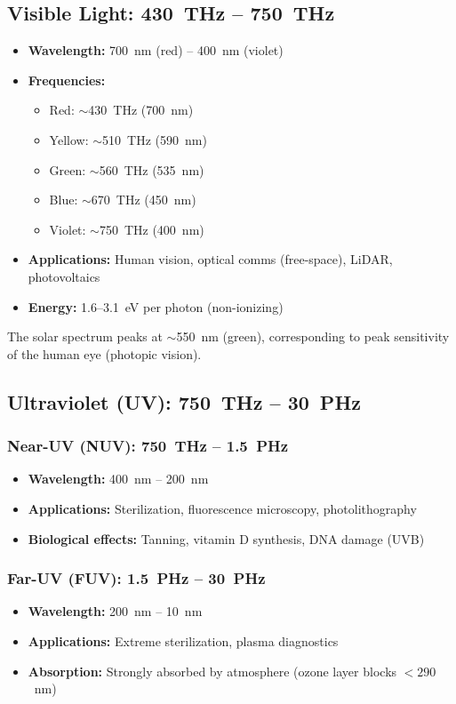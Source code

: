 \subsection{Visible Light: 430~THz -- 750~THz}

\begin{itemize}
\item \textbf{Wavelength:} 700~nm (red) -- 400~nm (violet)
\item \textbf{Frequencies:}
  \begin{itemize}
  \item Red: $\sim$430~THz (700~nm)
  \item Yellow: $\sim$510~THz (590~nm)
  \item Green: $\sim$560~THz (535~nm)
  \item Blue: $\sim$670~THz (450~nm)
  \item Violet: $\sim$750~THz (400~nm)
  \end{itemize}
\item \textbf{Applications:} Human vision, optical comms (free-space), LiDAR, photovoltaics
\item \textbf{Energy:} 1.6--3.1~eV per photon (non-ionizing)
\end{itemize}

The solar spectrum peaks at $\sim$550~nm (green), corresponding to peak sensitivity of the human eye (photopic vision).

\subsection{Ultraviolet (UV): 750~THz -- 30~PHz}

\subsubsection{Near-UV (NUV): 750~THz -- 1.5~PHz}
\begin{itemize}
\item \textbf{Wavelength:} 400~nm -- 200~nm
\item \textbf{Applications:} Sterilization, fluorescence microscopy, photolithography
\item \textbf{Biological effects:} Tanning, vitamin D synthesis, DNA damage (UVB)
\end{itemize}

\subsubsection{Far-UV (FUV): 1.5~PHz -- 30~PHz}
\begin{itemize}
\item \textbf{Wavelength:} 200~nm -- 10~nm
\item \textbf{Applications:} Extreme sterilization, plasma diagnostics
\item \textbf{Absorption:} Strongly absorbed by atmosphere (ozone layer blocks $< 290$~nm)
\end{itemize}

